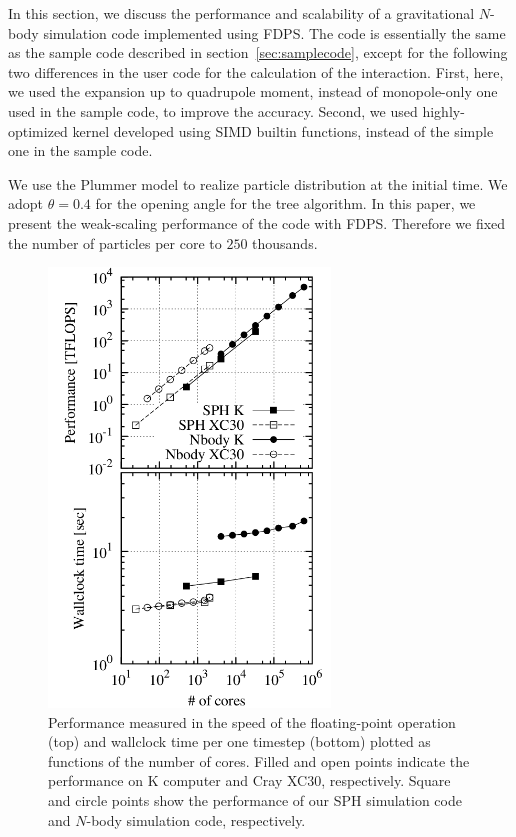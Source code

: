 In this section, we discuss the performance and scalability of a
gravitational $N$-body simulation code implemented using FDPS. The
code is essentially the same as the sample code described in
section~\ref{sec:samplecode}, except for the following two differences
in the user code for the calculation of the interaction. First, here,
we used the expansion up to quadrupole moment, instead of
monopole-only one used in the sample code, to improve the
accuracy. Second, we used highly-optimized kernel developed using SIMD
builtin functions, instead of the simple one in the sample code.

We use the Plummer model \cite{1911MNRAS..71..460P} to realize
particle distribution at the initial time. We adopt $\theta=0.4$ for
the opening angle for the tree algorithm. In this paper, we present
the weak-scaling performance of the code with FDPS. Therefore we fixed
the number of particles per core to $250$ thousands.

\begin{figure}
  \begin{center}
      \includegraphics[width=7.5cm,bb=0 0 540 840]{../sandbox/tanikawa_box/figure/ws_sc15/bench.png}
  \end{center}
  \caption{Performance measured in the speed of the floating-point
    operation (top) and wallclock time per one timestep (bottom)
    plotted as functions of the number of cores. Filled and open
    points indicate the performance on K computer and Cray XC30,
    respectively. Square and circle points show the performance of our
    SPH simulation code and $N$-body simulation code, respectively.}
  \label{fig:benchdisk}
\end{figure}

